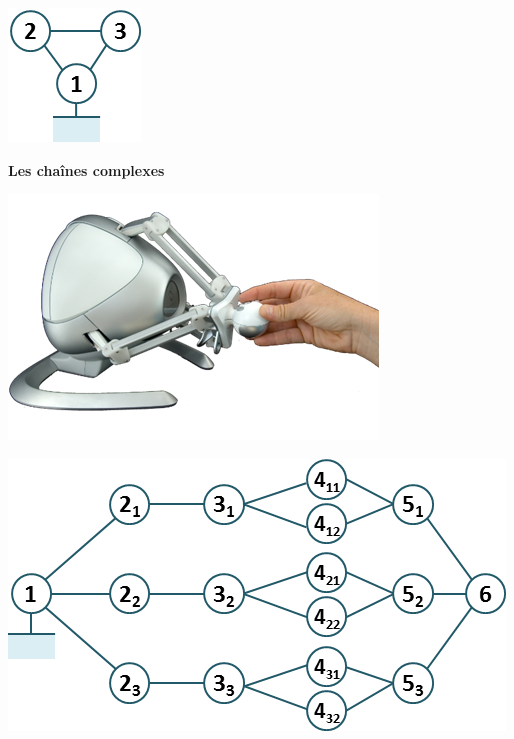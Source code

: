 \documentclass[10pt,fleqn]{article} %
\begin{document}
\begin{defi}
\begin{multicols}{3}
\begin{center}
\vspace{.5cm}

\includegraphics[width=.6\linewidth]{images/sympact_02}
\end{center}

\vfill\null
\columnbreak

\begin{center}
\textbf{Les chaînes complexes} 
\end{center}

\begin{center}
\includegraphics[width=.95\linewidth]{images/haptique_01}

\vspace{.5cm}

\includegraphics[width=.95\linewidth]{images/haptique_02}
\end{center}


\end{multicols}
\end{defi}
\end{document}
